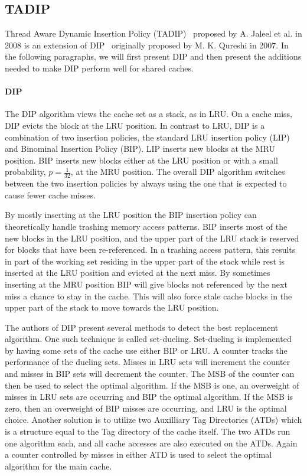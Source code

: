 \subsection{TADIP}
\label{sec:background:algorithms:tadip}

Thread Aware Dynamic Insertion Policy (TADIP)~\cite{Jaleel2008} proposed by A. Jaleel et al. in 2008 is an extension of DIP~\cite{Qureshi2007} originally proposed by M. K. Qureshi in 2007.
In the following paragraphs, we will first present DIP and then present the additions needed to make DIP perform well for shared caches.

\paragraph{DIP}

The DIP algorithm views the cache set as a stack, as in LRU.
On a cache miss, DIP evicts the block at the LRU position. 
In contrast to LRU, DIP is a combination of two insertion policies, the standard LRU insertion policy (LIP) and Binominal Insertion Policy (BIP).
LIP inserts new blocks at the MRU position.
BIP inserts new blocks either at the LRU position or with a small probability, $p = \frac{1}{32}$, at the MRU position. The overall DIP algorithm switches between the two insertion policies by always using the one that is expected to cause fewer cache misses.

By mostly inserting at the LRU position the BIP insertion policy can theoretically handle trashing memory access patterns.
BIP inserts most of the new blocks in the LRU position, and the upper part of the LRU stack is reserved for blocks that have been re-referenced.
In a trashing access pattern, this results in part of the working set residing in the upper part of the stack while rest is inserted at the LRU position and evicted at the next miss.
By sometimes inserting at the MRU position BIP will give blocks not referenced by the next miss a chance to stay in the cache. 
This will also force stale cache blocks in the upper part of the stack to move towards the LRU position.

The authors of DIP present several methods to detect the best replacement algorithm. 
One such technique is called set-dueling.
Set-dueling is implemented by having some sets of the cache use either BIP or LRU. 
A counter tracks the performance of the dueling sets.
Misses in LRU sets will increment the counter and misses in BIP sets will decrement the counter.
The MSB of the counter can then be used to select the optimal algorithm.
If the MSB is one, an overweight of misses in LRU sets are occurring and BIP the optimal algorithm. 
If the MSB is zero, then an overweight of BIP misses are occurring, and LRU is the optimal choice.
Another solution is to utilize two Auxilliary Tag Directories (ATDs) which is a structure equal to the Tag directory of the cache itself.
The two ATDs run one algorithm each, and all cache accesses are also executed on the ATDs.
Again a counter controlled by misses in either ATD is used to select the optimal algorithm for the main cache.

